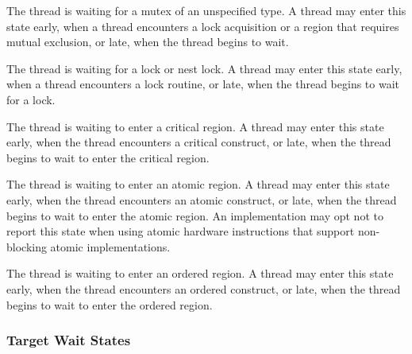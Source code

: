 \begin{description}

\item {}

  The thread is waiting for a mutex of an unspecified type. A 
  thread may enter this state early, when a thread encounters a lock acquisition or a region that requires mutual exclusion, or late, when the thread begins to wait.

\item {}

  The thread is waiting for a  lock  or nest lock. A 
  thread may enter this state early, when a thread
  encounters a lock  routine, or late, when the thread
  begins to wait for a lock.

\item {} 

  The thread is waiting to enter a critical region. A 
  thread may enter this state early, when the
  thread encounters a critical construct, or late, when the thread
  begins to wait to enter the critical region. 


\item {} 

  The thread is waiting to enter an atomic region. A 
  thread may enter this state early, when the thread
  encounters an atomic construct, or late, when the thread begins
  to wait to enter the atomic region. 
  An implementation may opt not to report
  this state when using atomic hardware instructions that support non-blocking atomic implementations.
  

\item {} 

  The thread is waiting to enter an ordered region. A 
  thread may enter this state early, when the thread encounters
  an ordered construct, or late, when the thread begins
  to wait to enter the ordered region. 
  
\end{description}
  
\subsubsection{Target Wait States}

